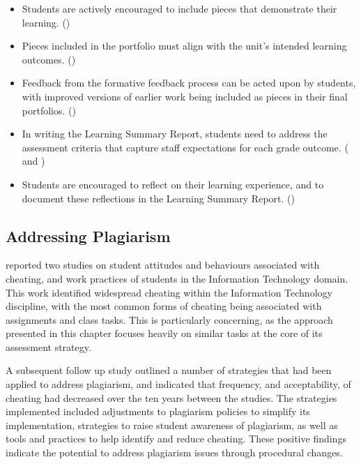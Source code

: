 \begin{itemize}[noitemsep,nolistsep]
	\item Students are actively encouraged to include pieces that demonstrate their learning.  ()
	\item Pieces included in the portfolio must align with the unit's intended learning outcomes. ()
	\item Feedback from the formative feedback process can be acted upon by students, with improved versions of earlier work being included as pieces in their final portfolios. ()
	\item In writing the Learning Summary Report, students need to address the assessment criteria that capture staff expectations for each grade outcome. ( and )
	\item Students are encouraged to reflect on their learning experience, and to document these reflections in the Learning Summary Report. ()
\end{itemize}



\subsection{Addressing Plagiarism} %
\label{sub:addressing_plagiarism}

\citet{Sheard:2003} reported two studies on student attitudes and behaviours associated with cheating, and work practices of students in the Information Technology domain. This work identified widespread cheating within the Information Technology discipline, with the most common forms of cheating being associated with assignments and class tasks. This is particularly concerning, as the approach presented in this chapter focuses heavily on similar tasks at the core of its assessment strategy.

A subsequent follow up study \citep{Sheard:2011} outlined a number of strategies that had been applied to address plagiarism, and indicated that frequency, and acceptability, of cheating had decreased over the ten years between the studies. The strategies implemented included adjustments to plagiarism policies to simplify its implementation, strategies to raise student awareness of plagiarism, as well as tools and practices to help identify and reduce cheating. These positive findings indicate the potential to address plagiarism issues through procedural changes.

